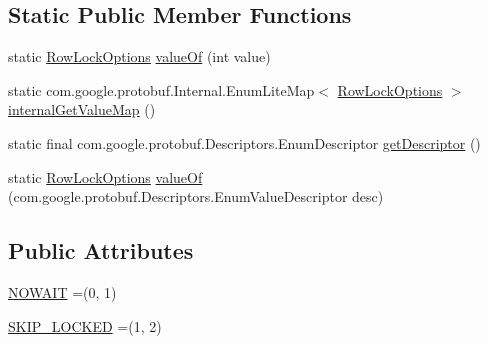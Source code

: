 \subsection*{Static Public Member Functions}
\begin{DoxyCompactItemize}
\item 
static \mbox{\hyperlink{enumcom_1_1mysql_1_1cj_1_1x_1_1protobuf_1_1_mysqlx_crud_1_1_find_1_1_row_lock_options}{Row\+Lock\+Options}} \mbox{\hyperlink{enumcom_1_1mysql_1_1cj_1_1x_1_1protobuf_1_1_mysqlx_crud_1_1_find_1_1_row_lock_options_a006113715ae82efcdb57e846d66724a6}{value\+Of}} (int value)
\item 
static com.\+google.\+protobuf.\+Internal.\+Enum\+Lite\+Map$<$ \mbox{\hyperlink{enumcom_1_1mysql_1_1cj_1_1x_1_1protobuf_1_1_mysqlx_crud_1_1_find_1_1_row_lock_options}{Row\+Lock\+Options}} $>$ \mbox{\hyperlink{enumcom_1_1mysql_1_1cj_1_1x_1_1protobuf_1_1_mysqlx_crud_1_1_find_1_1_row_lock_options_ae4c2b7364a7775f746d6ea7af3fa9b9f}{internal\+Get\+Value\+Map}} ()
\item 
static final com.\+google.\+protobuf.\+Descriptors.\+Enum\+Descriptor \mbox{\hyperlink{enumcom_1_1mysql_1_1cj_1_1x_1_1protobuf_1_1_mysqlx_crud_1_1_find_1_1_row_lock_options_a4d583191b8a98a95e82d3e56dd61144c}{get\+Descriptor}} ()
\item 
static \mbox{\hyperlink{enumcom_1_1mysql_1_1cj_1_1x_1_1protobuf_1_1_mysqlx_crud_1_1_find_1_1_row_lock_options}{Row\+Lock\+Options}} \mbox{\hyperlink{enumcom_1_1mysql_1_1cj_1_1x_1_1protobuf_1_1_mysqlx_crud_1_1_find_1_1_row_lock_options_a73479ab59ac0fdb759529e51d273baaa}{value\+Of}} (com.\+google.\+protobuf.\+Descriptors.\+Enum\+Value\+Descriptor desc)
\end{DoxyCompactItemize}
\subsection*{Public Attributes}
\begin{DoxyCompactItemize}
\item 
\mbox{\hyperlink{enumcom_1_1mysql_1_1cj_1_1x_1_1protobuf_1_1_mysqlx_crud_1_1_find_1_1_row_lock_options_a46bd28c80d8a1dbe711607733bb10867}{N\+O\+W\+A\+IT}} =(0, 1)
\item 
\mbox{\hyperlink{enumcom_1_1mysql_1_1cj_1_1x_1_1protobuf_1_1_mysqlx_crud_1_1_find_1_1_row_lock_options_a6d75989fe4e8d49f0ce557216bcbd8a0}{S\+K\+I\+P\+\_\+\+L\+O\+C\+K\+ED}} =(1, 2)
\end{DoxyCompactItemize}
